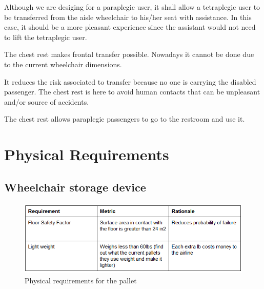 \begin{list}{-}{}
  \item Although we are desiging for a paraplegic user, it shall allow a tetraplegic user to be transferred from the aisle wheelchair to his/her seat with assistance. In this case, it should be a more pleasant experience since the assistant would not need to lift the tetraplegic user.
  \item The chest rest makes frontal transfer possible. Nowadays it cannot be done due to the current wheelchair dimensions.
  \item It reduces the risk associated to transfer because no one is carrying the disabled passenger. The chest rest is here to avoid human contacts that can be unpleasant and/or source of accidents.
  \item The chest rest allows paraplegic passengers to go to the restroom and use it.
\end{list}


\section{Physical Requirements}

\subsection*{Wheelchair storage device}

\begin{figure}[h!]
  \centering
     \includegraphics[scale=1]{images/physical_requirements_pallet.png}
   \caption{Physical requirements for the pallet}
  \label{fig:phy_req_pallet}
\end{figure}

\newpage

